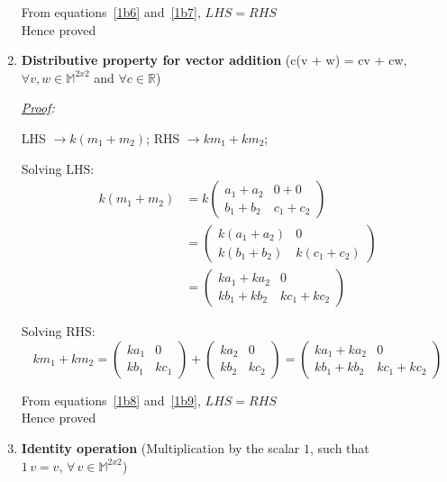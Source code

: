 \documentclass[12pt, letterpaper]{article}
\newcommand{\M}{\mathbb{M}^{2x2}}
\begin{document}
\begin{enumerate}
  From equations~\ref{1b6} and~\ref{1b7}, $\boxed{LHS = RHS}$
  \\Hence proved

\item \textbf{Distributive property for vector addition}
  (c(v + w) = cv + cw, $\forall v,w \in \M$ and $\forall c \in \mathbb{R}$)

\textit{\underline{Proof}:}

  LHS $\to k(m_1 + m_2)$; RHS $\to km_1 + km_2$;

  Solving LHS:
  \begin{equation}
  \label{1b8}
  \begin{split}
    k(m_1 + m_2)
    &= k\begin{pmatrix}a_1 + a_2&0 + 0\\b_1 + b_2&c_1 + c_2\end{pmatrix}\\
    &= \begin{pmatrix}k(a_1 + a_2)&0\\k(b_1 + b_2)&k(c_1 + c_2)\end{pmatrix}\\
    &= \begin{pmatrix}ka_1 + ka_2&0\\kb_1 + kb_2&kc_1 + kc_2\end{pmatrix}
  \end{split}
  \end{equation}

  Solving RHS:
  \begin{equation}
  \label{1b9}
    km_1 + km_2
    = \begin{pmatrix}ka_1&0\\kb_1&kc_1\end{pmatrix} + \begin{pmatrix}ka_2&0\\kb_2&kc_2\end{pmatrix}
    = \begin{pmatrix}ka_1 + ka_2&0\\kb_1 + kb_2&kc_1 + kc_2\end{pmatrix}
  \end{equation}

  From equations~\ref{1b8} and~\ref{1b9}, $\boxed{LHS = RHS}$
  \\Hence proved

\item \textbf{Identity operation}
  (Multiplication by the scalar $1$, such that $1\,v = v, \, \forall \, v \in \M$)


\end{enumerate}
\end{document}
